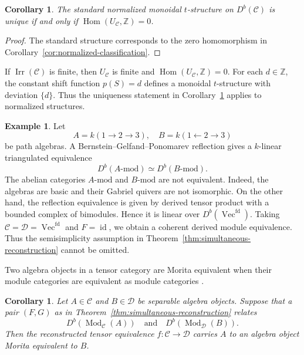 \documentclass[11pt]{amsart}
\newcommand{\C}{\mathcal C}
\newcommand{\D}{\mathcal D}
\newcommand{\Irr}{\operatorname{Irr}}
\newcommand{\Vect}{\operatorname{Vec}}
\newcommand{\Mod}{\operatorname{Mod}}
\DeclareMathOperator{\id}{id}
\DeclareMathOperator{\Hom}{Hom}
\newtheorem{corollary}[theorem]{Corollary}
\theoremstyle{definition}
\newtheorem{example}[theorem]{Example}
\theoremstyle{remark}
\theoremstyle{plain}
\begin{document}
\begin{corollary}\label{cor:unique-standard}
The standard normalized monoidal $t$-structure on $D^b(\C)$ is unique if and only if $\Hom(U_{\C},\mathbb Z)=0$.
\end{corollary}

\begin{proof}
The standard structure corresponds to the zero homomorphism in Corollary~\ref{cor:normalized-classification}.
\end{proof}

If $\Irr(\C)$ is finite, then $U_{\C}$ is finite and $\Hom(U_{\C},\mathbb Z)=0$. For each $d\in\mathbb Z$, the constant shift function $p(S)=d$ defines a monoidal $t$-structure with deviation $\{d\}$. Thus the uniqueness statement in Corollary~\ref{cor:unique-standard} applies to normalized structures.


\begin{example}\label{ex:nonsemisimple}
Let
\[
A=k(1\rightarrow2\rightarrow3),\quad B=k(1\leftarrow2\rightarrow3)
\]
be path algebras. A Bernstein--Gelfand--Ponomarev reflection gives a $k$-linear triangulated equivalence \cite{Happel}
\[
D^b(A\text{-mod})\simeq D^b(B\text{-mod}).
\]
The abelian categories $A\text{-mod}$ and $B\text{-mod}$ are not equivalent. Indeed, the algebras are basic and their Gabriel quivers are not isomorphic. On the other hand, the reflection equivalence is given by derived tensor product with a bounded complex of bimodules. Hence it is linear over $D^b(\Vect^{\mathrm{fd}})$. Taking $\C=\D=\Vect^{\mathrm{fd}}$ and $F=\id$, we obtain a coherent derived module equivalence. Thus the semisimplicity assumption in Theorem~\ref{thm:simultaneous-reconstruction} cannot be omitted.
\end{example}


Two algebra objects in a tensor category are Morita equivalent when their module categories are equivalent as module categories \cite[Definition~7.8.17]{EGNO}.

\begin{corollary}\label{cor:algebra-objects}
Let $A\in\C$ and $B\in\D$ be separable algebra objects. Suppose that a pair $(F,G)$ as in Theorem~\ref{thm:simultaneous-reconstruction} relates
\[
D^b(\Mod_{\C}(A))\quad\text{and}\quad D^b(\Mod_{\D}(B)).
\]
Then the reconstructed tensor equivalence $f:\C\to\D$ carries $A$ to an algebra object Morita equivalent to $B$.
\end{corollary}
\end{document}
